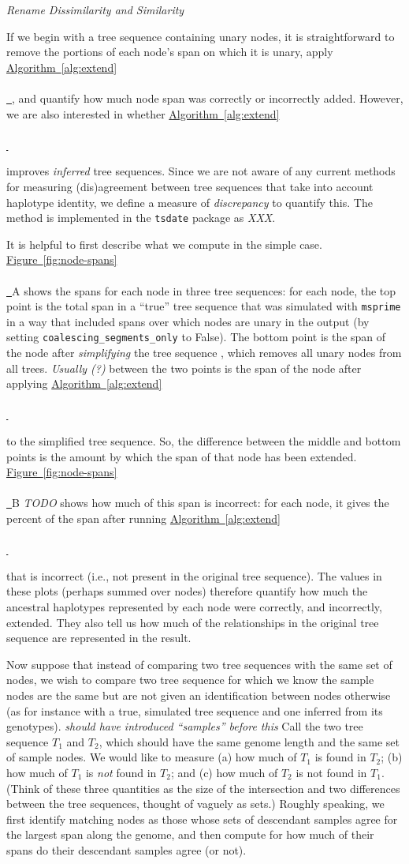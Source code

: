 \documentclass[10pt,twoside,lineno]{gsajnl}
\newcommand{\msprime}{\texttt{msprime}}
\newcommand{\comment}[1]{{\color{violet} \it #1}}
\newcommand{\algorithmref}[2][]{%
	\hyperref[{#2}]{%
		Algorithm~\ref*{#2}%
		\ifx\\#1\\%
		\else
		\,#1%
		\fi
	}%
}
\newcommand*{\figref}[2][]{%
	\hyperref[{#2}]{%
		Figure~\ref*{#2}%
		\ifx\\#1\\%
		\else
		\,#1%
		\fi
	}%
}
\begin{document}
\comment{Rename Dissimilarity and Similarity}

If we begin with a tree sequence containing unary nodes,
it is straightforward to remove the portions of each node's span on which it is unary,
apply \algorithmref{alg:extend},
and quantify how much node span was correctly or incorrectly added.
However, we are also interested in whether \algorithmref{alg:extend}
improves \emph{inferred} tree sequences.
Since we are not aware of any current methods for measuring (dis)agreement between tree sequences
that take into account haplotype identity,
we define a measure of \emph{discrepancy} to quantify this.
The method is implemented in the \texttt{tsdate} package \citep{wohns2022unified}
as \comment{XXX}.

It is helpful to first describe what we compute in the simple case.
\figref{fig:node-spans}A shows the spans for each node in three tree sequences:
for each node, the top point is the total span in a ``true'' tree sequence
that was simulated with \msprime \citep{kelleher2016efficient,baumdicker2021efficient}
in a way that included spans over which nodes are unary in the output
(by setting \texttt{coalescing\_segments\_only} to False).
The bottom point is the span of the node after \emph{simplifying} the tree sequence
\citep{kelleher2018efficient},
which removes all unary nodes from all trees.
\comment{Usually (?)} between the two points
is the span of the node after applying \algorithmref{alg:extend}
to the simplified tree sequence.
So, the difference between the middle and bottom points is the amount by which
the span of that node has been extended.
\figref{fig:node-spans}B \comment{TODO} shows how much of this span is incorrect:
for each node, it gives the percent of the span after running \algorithmref{alg:extend}
that is incorrect (i.e., not present in the original tree sequence).
The values in these plots (perhaps summed over nodes)
therefore quantify how much the ancestral haplotypes represented by each node
were correctly, and incorrectly, extended.
They also tell us how much of the relationships in the original tree sequence
are represented in the result.

Now suppose that instead of comparing two tree sequences with the same set of nodes,
we wish to compare two tree sequence for which we know the sample nodes are the same
but are not given an identification between nodes otherwise
(as for instance with a true, simulated tree sequence and one inferred from its genotypes).
\comment{should have introduced ``samples'' before this}
Call the two tree sequence $T_1$ and $T_2$, which should have the same genome length
and the same set of sample nodes.
We would like to measure (a) how much of $T_1$ is found in $T_2$;
(b) how much of $T_1$ is \emph{not} found in $T_2$; and
(c) how much of $T_2$ is not found in $T_1$.
(Think of these three quantities as the size of the intersection
and two differences between the tree sequences,
thought of vaguely as sets.)
Roughly speaking, we first identify matching nodes
as those whose sets of descendant samples agree for the largest span along the genome,
and then compute for how much of their spans do their descendant samples agree (or not).
\end{document}
